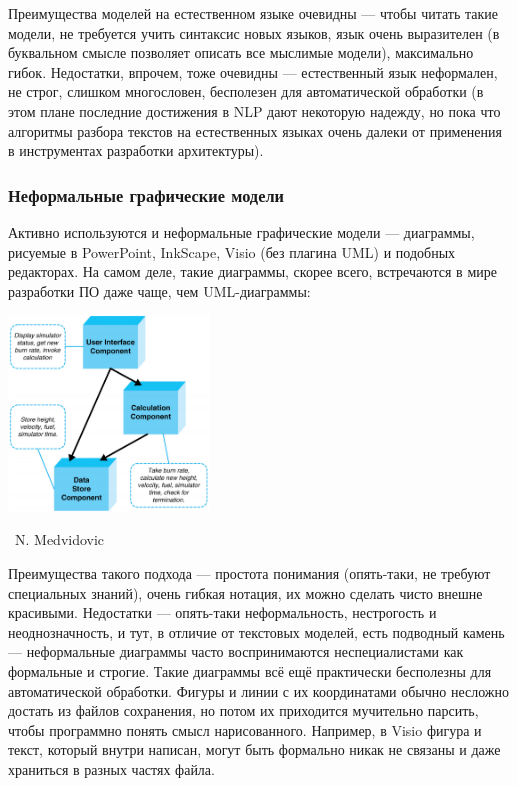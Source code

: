 \documentclass[a5paper]{article}
\newcommand{\attribution}[1] {
	\vspace{-5mm}\begin{flushright}\begin{scriptsize}%
	{\textcopyright\, #1}\end{scriptsize}\end{flushright}
}
\begin{document}
Преимущества моделей на естественном языке очевидны --- чтобы читать такие модели, не требуется учить синтаксис новых языков, язык очень выразителен (в буквальном смысле позволяет описать все мыслимые модели), максимально гибок. Недостатки, впрочем, тоже очевидны --- естественный язык неформален, не строг, слишком многословен, бесполезен для автоматической обработки (в этом плане последние достижения в NLP дают некоторую надежду, но пока что алгоритмы разбора текстов на естественных языках очень далеки от применения в инструментах разработки архитектуры).

\subsubsection{Неформальные графические модели}

Активно используются и неформальные графические модели --- диаграммы, рисуемые в PowerPoint, InkScape, Visio (без плагина UML) и подобных редакторах. На самом деле, такие диаграммы, скорее всего, встречаются в мире разработки ПО даже чаще, чем UML-диаграммы:

\begin{center}
	\includegraphics[width=0.4\textwidth]{informalModel.png}
	\attribution{N. Medvidovic}
\end{center}

Преимущества такого подхода --- простота понимания (опять-таки, не требуют специальных знаний), очень гибкая нотация, их можно сделать чисто внешне красивыми. Недостатки --- опять-таки неформальность, нестрогость и неоднозначность, и тут, в отличие от текстовых моделей, есть подводный камень --- неформальные диаграммы часто воспринимаются неспециалистами как формальные и строгие. Такие диаграммы всё ещё практически бесполезны для автоматической обработки. Фигуры и линии с их координатами обычно несложно достать из файлов сохранения, но потом их приходится мучительно парсить, чтобы программно понять смысл нарисованного. Например, в Visio фигура и текст, который внутри написан, могут быть формально никак не связаны и даже храниться в разных частях файла.
\end{document}
